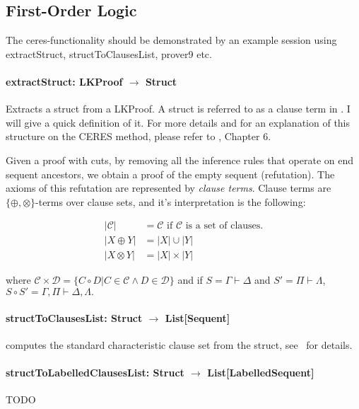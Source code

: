 \documentclass[a4paper,11pt]{article}
\newenvironment{meta}{\color{red}}{\color{black}}
\begin{document}
\subsection{First-Order Logic}

\begin{meta}
The ceres-functionality should be demonstrated by an example
session using extractStruct, structToClausesList, prover9 etc.
\end{meta}

\paragraph{\textbf{extractStruct: LKProof $\rightarrow$ Struct}}
Extracts a struct from a LKProof. A struct is referred to as a clause term in
\cite{Baaz2011}. I will give a quick definition of it. For more details and
for an explanation of this structure on the CERES method, please refer to
\cite{Baaz2011}, Chapter 6.

Given a proof with cuts, by removing all the inference rules that operate on end
sequent ancestors, we obtain a proof of the empty sequent (refutation). The
axioms of this refutation are represented by \textit{clause terms}. Clause
terms are $\{\oplus, \otimes\}$-terms over clause sets, and it's interpretation
is the following:

\begin{align*}
  |\mathcal{C}| &= \mathcal{C} \text{ if $\mathcal{C}$ is a set of clauses.}\\
   |X \oplus Y| &= |X| \cup |Y|\\
  |X \otimes Y| &= |X| \times |Y|
\end{align*}

where $\mathcal{C} \times \mathcal{D} = \{ C \circ D | C \in \mathcal{C} \wedge
D \in \mathcal{D}\}$ and if $S = \Gamma \vdash \Delta$ and $S' = \Pi \vdash
\Lambda$, $S \circ S' = \Gamma, \Pi \vdash \Delta, \Lambda.$

\paragraph{\textbf{structToClausesList: Struct $\rightarrow$ List[Sequent]}} computes
the standard characteristic clause set
from the struct, see~\cite[Section 4.2.1]{WoltzenlogelPaleo09General} for details.

\paragraph{\textbf{structToLabelledClausesList: Struct $\rightarrow$ List[LabelledSequent]}}
{\color{red}TODO}
\end{document}
